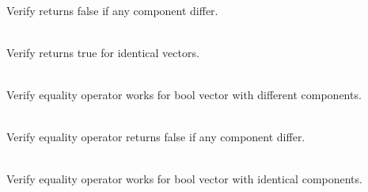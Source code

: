 \begin{DoxyRefList}
\item[{\parbox[t]{\linewidth}{Member \doxylink{group___f_g_m___vec4___equality_gacaf91e72758144731131d18928043074}{Vector4\+DEquality\+\_\+\+Equality\+\_\+\+Different\+Vectors\+Returns\+False} ()}}]\hfill \\
\label{test__test000068}%
%
Verify  returns false if any component differ.  
\item[{\parbox[t]{\linewidth}{Member \doxylink{group___f_g_m___vec4___equality_gaa171fa1e931412815c2284ea0fb0def3}{Vector4\+DEquality\+\_\+\+Equality\+\_\+\+Identical\+Vectors\+Returns\+True} ()}}]\hfill \\
\label{test__test000067}%
%
Verify  returns true for identical vectors.  
\item[{\parbox[t]{\linewidth}{Member \doxylink{group___f_g_m___vec4___equality_ga9cab8697516fcfe0f835530c5ef41121}{Vector4\+DEquality\+\_\+\+Equality\+Operator\+\_\+\+Different\+Boolean\+Vectors\+Returns\+False} ()}}]\hfill \\
\label{test__test000079}%
%
Verify  equality operator works for bool vector with different components.  
\item[{\parbox[t]{\linewidth}{Member \doxylink{group___f_g_m___vec4___equality_ga150ab58eb607c8471f938de0f481bdfd}{Vector4\+DEquality\+\_\+\+Equality\+Operator\+\_\+\+Different\+Vectors\+Returns\+False} ()}}]\hfill \\
\label{test__test000077}%
%
Verify  equality operator returns false if any component differ.  
\item[{\parbox[t]{\linewidth}{Member \doxylink{group___f_g_m___vec4___equality_gae2ebba909b2a66c0d76babaea309e85f}{Vector4\+DEquality\+\_\+\+Equality\+Operator\+\_\+\+Identical\+Boolean\+Vectors\+Returns\+True} ()}}]\hfill \\
\label{test__test000078}%
%
Verify  equality operator works for bool vector with identical components.  
\item[{\parbox[t]{\linewidth}{Member \doxylink{group___f_g_m___vec4___equality_gad24ea6306dd300444cc2df9a6217ec65}{Vector4\+DEquality\+\_\+\+Equality\+Operator\+\_\+\+Identical\+Vectors\+Returns\+True} ()}}]\hfill \\

\end{DoxyRefList}

